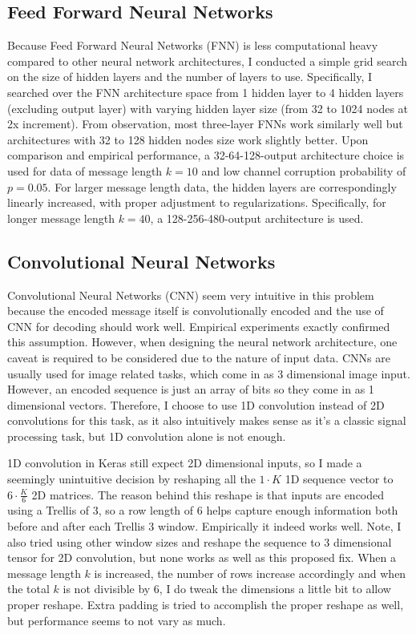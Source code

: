 \documentclass[10pt,twocolumn,letterpaper]{article}
\begin{document}
\subsection{Feed Forward Neural Networks}

Because Feed Forward Neural Networks (FNN) is less computational heavy compared to other neural network architectures, I conducted a simple grid search on the size of hidden layers and the number of layers to use. Specifically, I searched over the FNN architecture space from 1 hidden layer to 4 hidden layers (excluding output layer) with varying hidden layer size (from 32 to 1024 nodes at 2x increment). From observation, most three-layer FNNs work similarly well but architectures with 32 to 128 hidden nodes size work slightly better. Upon comparison and empirical performance, a 32-64-128-output architecture choice is used for data of message length $k=10$ and low channel corruption probability of $p=0.05$. For larger message length data, the hidden layers are correspondingly linearly increased, with proper adjustment to regularizations. Specifically, for longer message length $k=40$, a 128-256-480-output architecture is used.

\subsection{Convolutional Neural Networks}

Convolutional Neural Networks (CNN) seem very intuitive in this problem because the encoded message itself is convolutionally encoded and the use of CNN for decoding should work well. Empirical experiments exactly confirmed this assumption. However, when designing the neural network architecture, one caveat is required to be considered due to the nature of input data. CNNs are usually used for image related tasks, which come in as 3 dimensional image input. However, an encoded sequence is just an array of bits so they come in as 1 dimensional vectors. Therefore, I choose to use 1D convolution instead of 2D convolutions for this task, as it also intuitively makes sense as it's a classic signal processing task, but 1D convolution alone is not enough. 

1D convolution in Keras still expect 2D dimensional inputs, so I made a seemingly unintuitive decision by reshaping all the $1 \cdot K$ 1D sequence vector to $6 \cdot \frac{K}{6}$ 2D matrices. The reason behind this reshape is that inputs are encoded using a Trellis of 3, so a row length of 6 helps capture enough information both before and after each Trellis 3 window. Empirically it indeed works well. Note, I also tried using other window sizes and reshape the sequence to 3 dimensional tensor for 2D convolution, but none works as well as this proposed fix. When a message length $k$ is increased, the number of rows increase accordingly and when the total $k$ is not divisible by 6, I do tweak the dimensions a little bit to allow proper reshape. Extra padding is tried to accomplish the proper reshape as well, but performance seems to not vary as much.
\end{document}

